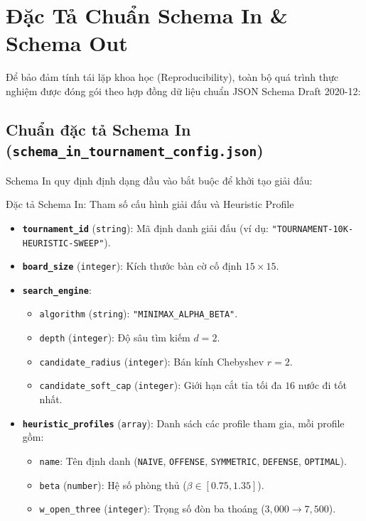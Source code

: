 \documentclass[11pt,a4paper]{article}
\begin{document}
\section{Đặc Tả Chuẩn Schema In \& Schema Out}

Để bảo đảm tính tái lặp khoa học (Reproducibility), toàn bộ quá trình thực nghiệm được đóng gói theo hợp đồng dữ liệu chuẩn JSON Schema Draft 2020-12:

\subsection{Chuẩn đặc tả Schema In (\texttt{schema\_in\_tournament\_config.json})}
Schema In quy định định dạng đầu vào bắt buộc để khởi tạo giải đấu:

\begin{codebox}{Đặc tả Schema In: Tham số cấu hình giải đấu và Heuristic Profile}
\small
\begin{itemize}
    \item \textbf{\texttt{tournament\_id}} (\texttt{string}): Mã định danh giải đấu (ví dụ: \texttt{"TOURNAMENT-10K-HEURISTIC-SWEEP"}).
    \item \textbf{\texttt{board\_size}} (\texttt{integer}): Kích thước bàn cờ cố định $15 \times 15$.
    \item \textbf{\texttt{search\_engine}}:
    \begin{itemize}
        \item \texttt{algorithm} (\texttt{string}): \texttt{"MINIMAX\_ALPHA\_BETA"}.
        \item \texttt{depth} (\texttt{integer}): Độ sâu tìm kiếm $d = 2$.
        \item \texttt{candidate\_radius} (\texttt{integer}): Bán kính Chebyshev $r = 2$.
        \item \texttt{candidate\_soft\_cap} (\texttt{integer}): Giới hạn cắt tỉa tối đa $16$ nước đi tốt nhất.
    \end{itemize}
    \item \textbf{\texttt{heuristic\_profiles}} (\texttt{array}): Danh sách các profile tham gia, mỗi profile gồm:
    \begin{itemize}
        \item \texttt{name}: Tên định danh (\texttt{NAIVE}, \texttt{OFFENSE}, \texttt{SYMMETRIC}, \texttt{DEFENSE}, \texttt{OPTIMAL}).
        \item \texttt{beta} (\texttt{number}): Hệ số phòng thủ ($\beta \in [0.75, 1.35]$).
        \item \texttt{w\_open\_three} (\texttt{integer}): Trọng số đòn ba thoáng ($3{,}000 \to 7{,}500$).

\end{itemize}
\end{itemize}
\end{codebox}
\end{document}
